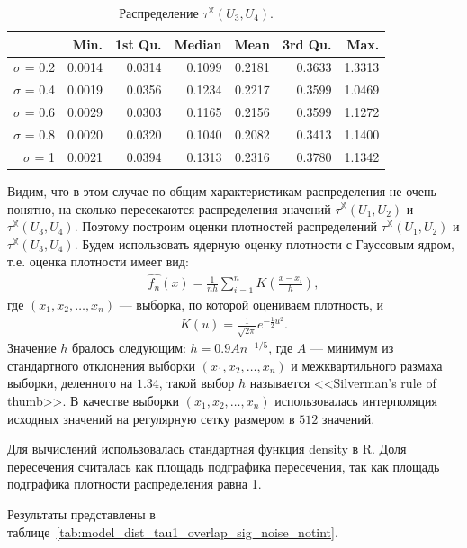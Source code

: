 \documentclass[specialist,
               substylefile = spbu.rtx,
               subf,href,colorlinks=true, 12pt]{disser}
\begin{document}
\begin{table}[hhh!]
\caption{Распределение $\tau^{\mathbb{X}}(U_3, U_4)$.}
\centering
\begin{tabular}{rrrrrrr}
  \hline
 & Min. & 1st Qu. & Median & Mean & 3rd Qu. & Max. \\
  \hline
$\sigma$ = 0.2 & 0.0014 & 0.0314 & 0.1099 & 0.2181 & 0.3633 & 1.3313 \\
  $\sigma$ = 0.4 & 0.0019 & 0.0356 & 0.1234 & 0.2217 & 0.3599 & 1.0469 \\
  $\sigma$ = 0.6 & 0.0029 & 0.0303 & 0.1165 & 0.2156 & 0.3599 & 1.1272 \\
  $\sigma$ = 0.8 & 0.0020 & 0.0320 & 0.1040 & 0.2082 & 0.3413 & 1.1400 \\
  $\sigma$ = 1 & 0.0021 & 0.0394 & 0.1313 & 0.2316 & 0.3780 & 1.1342 \\
   \hline
\end{tabular}
\label{tab:model_dist_tau1_sig_noise_notint2}
\end{table}

Видим, что в этом случае по общим характеристикам распределения не очень понятно, на сколько пересекаются распределения значений $\tau^{\mathbb{X}}(U_1, U_2)$ и  $\tau^{\mathbb{X}}(U_3, U_4)$.
Поэтому построим оценки плотностей распределений $\tau^{\mathbb{X}}(U_1, U_2)$ и  $\tau^{\mathbb{X}}(U_3, U_4)$.
Будем использовать ядерную оценку плотности с Гауссовым ядром, т.е. оценка плотности имеет вид:
\begin{gather*}
\hat{f_n}(x) = \frac{1}{nh} \sum_{i = 1}^{n}{K\left(\frac{x - x_i}{h}\right)},
\end{gather*}
где $(x_1,x_2,\ldots,x_n)$ --- выборка, по которой оцениваем плотность, и
\begin{gather*}
K(u) = \frac{1}{\sqrt{2\pi}}{e^{-\frac{1}{2}u^2}}.
\end{gather*}
Значение $h$ бралось следующим: $h = 0.9 A n^{-1/5}$, где $A$ --- минимум из стандартного отклонения выборки $(x_1,x_2,\ldots,x_n)$ и межквартильного размаха выборки, деленного на $1.34$, такой выбор $h$ называется <<Silverman’s rule of thumb>>. В качестве выборки $(x_1,x_2,\ldots,x_n)$ использовалась интерполяция исходных значений на регулярную сетку размером в $512$ значений.

Для вычислений использовалась стандартная функция density в R.
Доля пересечения считалась как площадь подграфика пересечения, так как площадь подграфика плотности распределения равна 1.

Результаты представлены в таблице~\ref{tab:model_dist_tau1_overlap_sig_noise_notint}.
\end{document}
